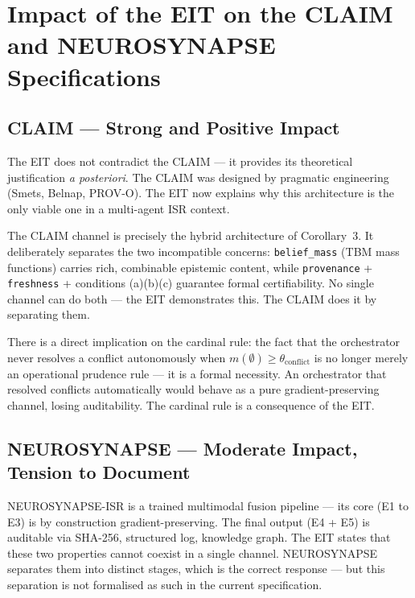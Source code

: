 \documentclass[11pt,a4paper]{article}
\theoremstyle{plain}
\begin{document}
\section{Impact of the EIT on the CLAIM and NEUROSYNAPSE Specifications}

\subsection{CLAIM --- Strong and Positive Impact}

The EIT does not contradict the CLAIM --- it provides its theoretical justification
\emph{a posteriori}. The CLAIM was designed by pragmatic engineering (Smets, Belnap,
PROV-O). The EIT now explains why this architecture is the only viable one in a
multi-agent ISR context.

The CLAIM channel is precisely the hybrid architecture of Corollary~3. It
deliberately separates the two incompatible concerns: \texttt{belief\_mass} (TBM
mass functions) carries rich, combinable epistemic content, while
\texttt{provenance} + \texttt{freshness} + conditions (a)(b)(c) guarantee formal
certifiability. No single channel can do both --- the EIT demonstrates this. The
CLAIM does it by separating them.

There is a direct implication on the cardinal rule: the fact that the orchestrator
never resolves a conflict autonomously when $m(\emptyset) \ge \theta_\text{conflict}$
is no longer merely an operational prudence rule --- it is a formal necessity. An
orchestrator that resolved conflicts automatically would behave as a pure
gradient-preserving channel, losing auditability. The cardinal rule is a consequence
of the EIT.

\subsection{NEUROSYNAPSE --- Moderate Impact, Tension to Document}

NEUROSYNAPSE-ISR is a trained multimodal fusion pipeline --- its core (E1 to E3)
is by construction gradient-preserving. The final output (E4 + E5) is auditable
via SHA-256, structured log, knowledge graph. The EIT states that these two
properties cannot coexist in a single channel. NEUROSYNAPSE separates them into
distinct stages, which is the correct response --- but this separation is not
formalised as such in the current specification.
\end{document}
